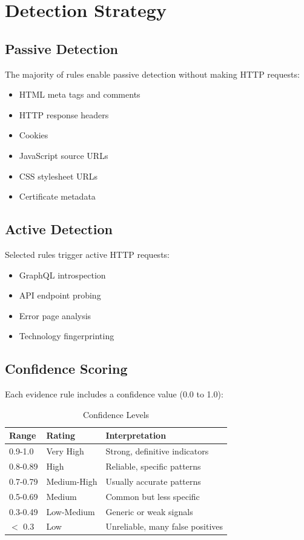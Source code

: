 \documentclass[11pt,a4paper,oneside]{article}
\begin{document}
\section{Detection Strategy}

\subsection{Passive Detection}
The majority of rules enable passive detection without making HTTP requests:

\begin{itemize}
    \item HTML meta tags and comments
    \item HTTP response headers
    \item Cookies
    \item JavaScript source URLs
    \item CSS stylesheet URLs
    \item Certificate metadata
\end{itemize}

\subsection{Active Detection}
Selected rules trigger active HTTP requests:

\begin{itemize}
    \item GraphQL introspection
    \item API endpoint probing
    \item Error page analysis
    \item Technology fingerprinting
\end{itemize}

\subsection{Confidence Scoring}
Each evidence rule includes a confidence value (0.0 to 1.0):

\begin{table}[H]
\centering
\caption{Confidence Levels}
\label{tab:confidence}
\begin{tabular}{|l|l|p{5cm}|}
\hline
\textbf{Range} & \textbf{Rating} & \textbf{Interpretation} \\
\hline
0.9-1.0 & Very High & Strong, definitive indicators \\
0.8-0.89 & High & Reliable, specific patterns \\
0.7-0.79 & Medium-High & Usually accurate patterns \\
0.5-0.69 & Medium & Common but less specific \\
0.3-0.49 & Low-Medium & Generic or weak signals \\
$<$ 0.3 & Low & Unreliable, many false positives \\
\hline
\end{tabular}
\end{table}
\end{document}
